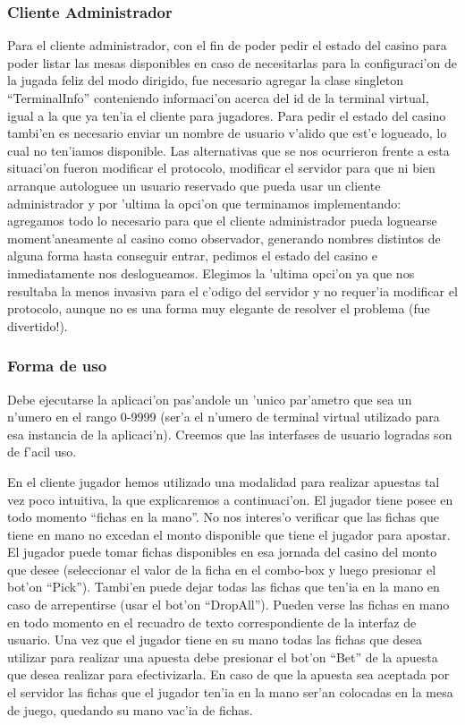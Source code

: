 \subsubsection{Cliente Administrador}
Para el cliente administrador, con el fin de poder pedir el estado del casino para poder listar las mesas disponibles en caso de necesitarlas para la configuraci'on de la jugada feliz del modo dirigido, fue necesario agregar la clase singleton ``TerminalInfo'' conteniendo informaci'on acerca del id de la terminal virtual, igual a la que ya ten'ia el cliente para jugadores. Para pedir el estado del casino tambi'en es necesario enviar un nombre de usuario v'alido que est'e logueado, lo cual no ten'iamos disponible. Las alternativas que se nos ocurrieron frente a esta situaci'on fueron modificar el protocolo, modificar el servidor para que ni bien arranque autologuee un usuario reservado que pueda usar un cliente administrador y por 'ultima la opci'on que terminamos implementando: agregamos todo lo necesario para que el cliente administrador pueda loguearse moment'aneamente al casino como observador, generando nombres distintos de alguna forma hasta conseguir entrar, pedimos el estado del casino e inmediatamente nos deslogueamos. Elegimos la 'ultima opci'on ya que nos resultaba la menos invasiva para el c'odigo del servidor y no requer'ia modificar el protocolo, aunque no es una forma muy elegante de resolver el problema (fue divertido!).

\subsubsection{Forma de uso}
Debe ejecutarse la aplicaci'on pas'andole un 'unico par'ametro que sea un n'umero en el rango 0-9999 (ser'a el n'umero de terminal virtual utilizado para esa instancia de la aplicaci'n). Creemos que las interfases de usuario logradas son de f'acil uso.

En el cliente jugador hemos utilizado una modalidad para realizar apuestas tal vez poco intuitiva, la que explicaremos a continuaci'on.
El jugador tiene posee en todo momento ``fichas en la mano''. No nos interes'o verificar que las fichas que tiene en mano no excedan el monto disponible que tiene el jugador para apostar. El jugador puede tomar fichas disponibles en esa jornada del casino del monto que desee (seleccionar el valor de la ficha en el combo-box y luego presionar el bot'on ``Pick''). Tambi'en puede dejar todas las fichas que ten'ia en la mano en caso de arrepentirse (usar el bot'on ``DropAll''). Pueden verse las fichas en mano en todo momento en el recuadro de texto correspondiente de la interfaz de usuario. Una vez que el jugador tiene en su mano todas las fichas que desea utilizar para realizar una apuesta debe presionar el bot'on ``Bet'' de la apuesta que desea realizar para efectivizarla. En caso de que la apuesta sea aceptada por el servidor las fichas que el jugador ten'ia en la mano ser'an colocadas en la mesa de juego, quedando su mano vac'ia de fichas.
